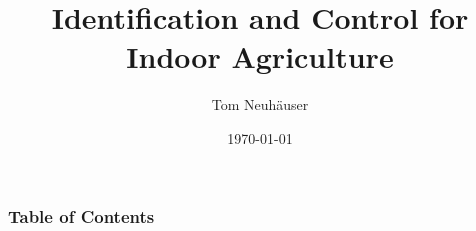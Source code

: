 \documentclass{beamer}
\title{Identification and Control for Indoor Agriculture}
\author{Tom Neuh\"auser}
\date{\today}
\begin{document}
\frame{\titlepage}

\begin{frame}
    \frametitle{Table of Contents}
    \tableofcontents
\end{frame}







\end{document}
